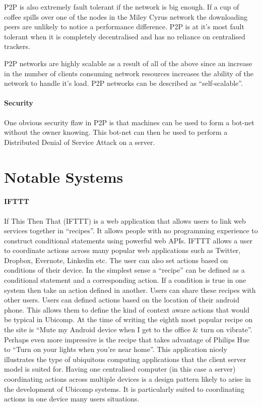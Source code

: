 \documentclass[11pt]{amsart}
\begin{document}
\indent P2P is also extremely fault tolerant if the network is big enough. If a cup of coffee spills over one of the nodes in the Miley Cyrus network the downloading peers are unlikely to notice a performance difference.
P2P is at it's most fault tolerant when it is completely decentralised and has no reliance on centralised trackers.

\indent P2P networks are highly scalable as a result of all of the above since an increase in the number of clients consuming network resources increases the ability of the network to handle it's load. P2P networks can be described as ``self-scalable''.

\subsection{Security}

One obvious security flaw in P2P is that machines can be used to form a bot-net without the owner knowing. This bot-net can then be used to perform a Distributed Denial of Service Attack on a server.

\part{Notable Systems}

\subsection{IFTTT}

If This Then That (IFTTT) is a web application that allows users to link web services together in ``recipes''. It allows people with no programming experience to construct conditional statements using powerful web APIs. 
IFTTT allows a user to coordinate actions across many popular web applications such as Twitter, Dropbox, Evernote, Linkedin etc. The user can also set actions based on conditions of their device. In the simplest sense a ``recipe'' can be defined as a conditional statement and a corresponding action. If a condition is true in one system then take an action defined in another. Users can share these recipes with other users.
Users can defined actions based on the location of their android phone. This allows them to define the kind of context aware actions that would be typical in Ubicomp. At the time of writing the eighth most popular recipe on the site is ``Mute my Android device when I get to the office & turn on vibrate''. Perhaps even more impressive is the recipe that takes advantage of Philips Hue to ``Turn on your lights when you're near home''.
This application nicely illustrates the type of ubiquitous computing applications that the client server model is suited for. Having one centralised computer (in this case a server) coordinating actions across multiple devices is a design pattern likely to arise in the development of Ubicomp systems. It is particularly suited to coordinating actions in one device many users situations. 
\end{document}

